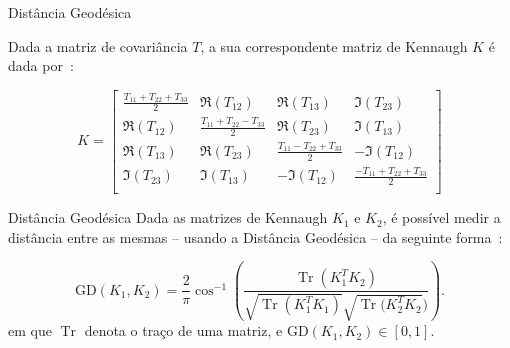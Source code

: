 \documentclass[10pt]{beamer}
\newcommand{\Tr}{\operatorname{Tr}}
\begin{document}
\begin{frame}{Distância Geodésica}

Dada a matriz de covariância $T$, a sua correspondente matriz de Kennaugh $K$ é dada por~\cite{ClassificationPolSARGeodesic}:


\scriptsize
\begin{equation}
K =
\begin{bmatrix}
\frac{ T_{11} + T_{22} + T_{33} }{2} & \Re(T_{12}) & \Re(T_{13}) & \Im(T_{23})\\
\Re(T_{12}) & \frac{T_{11} + T_{22} - T_{33}}{2} & \Re(T_{23}) & \Im(T_{13})\\
\Re(T_{13}) & \Re(T_{23}) & \frac{ T_{11} - T_{22} + T_{33} }{2} & -\Im(T_{12})\\
\Im(T_{23}) & \Im(T_{13}) & -\Im(T_{12}) & \frac{ -T_{11} + T_{22} + T_{33} }{2}\\
\end{bmatrix}
\end{equation}

\normalsize
    
\end{frame}

\begin{frame}{Distância Geodésica}
    Dada as matrizes de Kennaugh $K_1$ e $K_2$, é possível medir a distância entre as mesmas -- usando a Distância Geodésica -- da seguinte forma~\cite{ClassificationPolSARGeodesic}:
    
\begin{equation}
\text{GD}(K_1, K_2) = \frac{2}{\pi} \cos^{-1} \left(\frac{\Tr(K_1^T K_2)}{\sqrt{\Tr(K_1^T K_1)} \sqrt{\Tr(K_2^T K_2})} \right).
\end{equation}
em que $\Tr$ denota o traço de uma matriz, e $\text{GD}(K_1, K_2) \in [0,1]$.
    
\end{frame}
\end{document}
